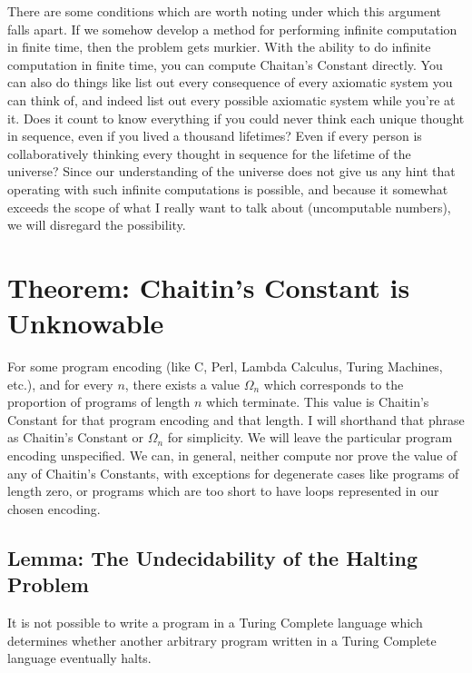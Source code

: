 \documentclass{article}
\begin{document}
There are some conditions which are worth noting under which this argument falls apart. If we somehow develop a method for performing infinite computation in finite time, then the problem gets murkier. With the ability to do infinite computation in finite time, you can compute Chaitan's Constant directly. You can also do things like list out every consequence of every axiomatic system you can think of, and indeed list out every possible axiomatic system while you're at it. Does it count to know everything if you could never think each unique thought in sequence, even if you lived a thousand lifetimes? Even if every person is collaboratively thinking every thought in sequence for the lifetime of the universe? Since our understanding of the universe does not give us any hint that operating with such infinite computations is possible, and because it somewhat exceeds the scope of what I really want to talk about (uncomputable numbers), we will disregard the possibility.

\section{Theorem: Chaitin's Constant is Unknowable}
For some program encoding (like C, Perl, Lambda Calculus, Turing Machines, etc.), and for every $n$, there exists a value $\Omega_n$ which corresponds to the proportion of programs of length $n$ which terminate. This value is Chaitin's Constant for that program encoding and that length. I will shorthand that phrase as Chaitin's Constant or $\Omega_n$ for simplicity. We will leave the particular program encoding unspecified. We can, in general, neither compute nor prove the value of any of Chaitin's Constants, with exceptions for degenerate cases like programs of length zero, or programs which are too short to have loops represented in our chosen encoding.\\

\subsection{Lemma: The Undecidability of the Halting Problem}
It is not possible to write a program in a Turing Complete language which determines whether another arbitrary program written in a Turing Complete language eventually halts.\\
\end{document}
